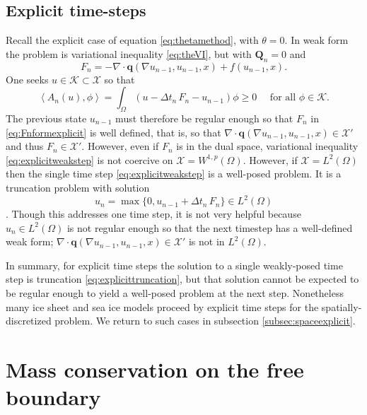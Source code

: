 \documentclass[final,leqno,onefignum,onetabnum]{siamltex1213bueler}
\newcommand\bq{\mathbf{q}}
\newcommand\bQ{\mathbf{Q}}
\newcommand{\Div}{\nabla\cdot}
\renewcommand{\grad}{\nabla}
\newcommand{\ip}[2]{\ensuremath{\left<#1,#2\right>}}
\begin{document}
\subsection{Explicit time-steps} \label{subsec:explicit}  Recall the explicit case of equation \eqref{eq:thetamethod}, with $\theta=0$.  In weak form the problem is variational inequality \eqref{eq:theVI}, but with $\bQ_n=0$ and
\begin{equation}
F_n = - \Div \bq(\grad u_{n-1},u_{n-1},x) + f(u_{n-1},x).  \label{eq:Fnformexplicit}
\end{equation}
One seeks $u\in\mathcal{K} \subset \mathcal{X}$ so that
\begin{equation}
\ip{A_n(u)}{\phi} = \int_\Omega (u - \Delta t_n\,F_n - u_{n-1})\phi \ge 0 \quad \text{ for all } \phi \in \mathcal{K}.  \label{eq:explicitweakstep}
\end{equation}
The previous state $u_{n-1}$ must therefore be regular enough so that $F_n$ in \eqref{eq:Fnformexplicit} is well defined, that is, so that $\Div \bq(\grad u_{n-1},u_{n-1},x) \in \mathcal{X}'$ and thus $F_n\in\mathcal{X}'$.  However, even if $F_n$ is in the dual space, variational inequality \eqref{eq:explicitweakstep} is not coercive on $\mathcal{X}=W^{1,p}(\Omega)$.  However, if $\mathcal{X}=L^2(\Omega)$ then the single time step \eqref{eq:explicitweakstep} is a well-posed problem.  It is a truncation problem with solution
\begin{equation}
u_n = \max\{0,u_{n-1} + \Delta t_n\,F_n\} \in L^2(\Omega)  \label{eq:explicittruncation}
\end{equation}
\cite[page 27]{KinderlehrerStampacchia1980}.  Though this addresses one time step, it is not very helpful because $u_n \in L^2(\Omega)$ is not regular enough so that the next timestep has a well-defined weak form; $\Div \bq(\grad u_{n-1},u_{n-1},x) \in \mathcal{X}'$ is not in $L^2(\Omega)$.

In summary, for explicit time steps the solution to a single weakly-posed time step is truncation \eqref{eq:explicittruncation}, but that solution cannot be expected to be regular enough to yield a well-posed problem at the next step.  Nonetheless many ice sheet \cite{Bueleretal2005} and sea ice \cite{Thorndikeetal1975} models proceed by explicit time steps for the spatially-discretized problem.  We return to such cases in subsection \ref{subsec:spaceexplicit}.


\section{Mass conservation on the free boundary}  \label{sec:timeseries}
\end{document}
